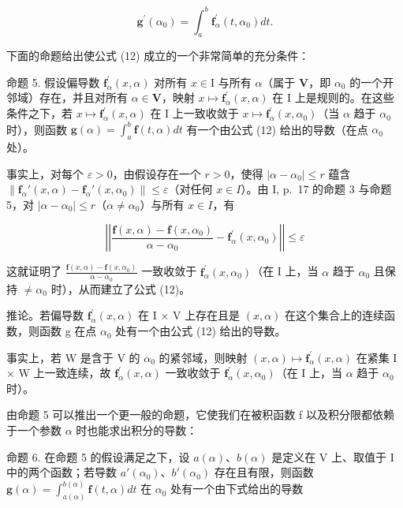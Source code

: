 \[
\mathbf {g} ^ {\prime} (\alpha_ {0}) = \int_ {a} ^ {b} \mathbf {f} _ {\alpha} ^ {\prime} (t, \alpha_ {0}) d t.\tag{12}
\]

下面的命题给出使公式 (12) 成立的一个非常简单的充分条件：

命题 5. 假设偏导数 \(\mathbf{f}_{\alpha}^{\prime}(x,\alpha)\) 对所有 \(x\in \mathrm{I}\) 与所有 \(\alpha\)（属于 \(\mathbf{V}\)，即 \(\alpha_0\) 的一个开邻域）存在，并且对所有 \(\alpha \in \mathbf{V}\)，映射 \(x\mapsto \mathbf{f}_{\alpha}^{\prime}(x,\alpha)\) 在 \(\mathrm{I}\) 上是规则的。在这些条件之下，若 \(x\mapsto \mathbf{f}_{\alpha}^{\prime}(x,\alpha)\) 在 \(\mathrm{I}\) 上一致收敛于 \(x\mapsto \mathbf{f}_{\alpha}^{\prime}(x,\alpha_0)\)（当 \(\alpha\) 趋于 \(\alpha_0\) 时），则函数 \(\mathbf{g}(\alpha) = \int_{a}^{b}\mathbf{f}(t,\alpha)dt\) 有一个由公式 (12) 给出的导数（在点 \(\alpha_0\) 处）。

事实上，对每个 \(\varepsilon > 0\)，由假设存在一个 \(r > 0\)，使得 \(|\alpha - \alpha_0| \leqslant r\) 蕴含 \(\left\| \mathbf{f}_{\alpha}'(x, \alpha) - \mathbf{f}_{\alpha}'(x, \alpha_0) \right\| \leqslant \varepsilon\)（对任何 \(x \in I\)）。由 I, p.~17 的命题 3 与命题 5，对 \(|\alpha - \alpha_0| \leqslant r\)（\(\alpha \neq \alpha_0\)）与所有 \(x \in I\)，有

\[
\left| \left| \frac {\mathbf {f} (x , \alpha) - \mathbf {f} (x , \alpha_ {0})}{\alpha - \alpha_ {0}} - \mathbf {f} _ {\alpha} ^ {\prime} (x, \alpha_ {0}) \right| \right| \leqslant \varepsilon
\]

这就证明了 \(\frac{\mathbf{f}(x,\alpha)-\mathbf{f}(x,\alpha_{0})}{\alpha-\alpha_{0}}\) 一致收敛于 \(\mathbf{f}_{\alpha}^{\prime}(x,\alpha_{0})\)（在 I 上，当 \(\alpha\) 趋于 \(\alpha_{0}\) 且保持 \(\neq\alpha_{0}\) 时），从而建立了公式 (12)。

推论。若偏导数 \(\mathbf{f}_{\alpha}^{\prime}(x,\alpha)\) 在 I × V 上存在且是 \((x,\alpha)\) 在这个集合上的连续函数，则函数 g 在点 \(\alpha_{0}\) 处有一个由公式 (12) 给出的导数。

事实上，若 W 是含于 V 的 \(\alpha_{0}\) 的紧邻域，则映射 \((x,\alpha)\mapsto\mathbf{f}_{\alpha}^{\prime}(x,\alpha)\) 在紧集 I × W 上一致连续，故 \(\mathbf{f}_{\alpha}^{\prime}(x,\alpha)\) 一致收敛于 \(\mathbf{f}_{\alpha}^{\prime}(x,\alpha_{0})\)（在 I 上，当 \(\alpha\) 趋于 \(\alpha_{0}\) 时）。

由命题 5 可以推出一个更一般的命题，它使我们在被积函数 f 以及积分限都依赖于一个参数 \(\alpha\) 时也能求出积分的导数：

命题 6. 在命题 5 的假设满足之下，设 \(a(\alpha)\)、\(b(\alpha)\) 是定义在 V 上、取值于 I 中的两个函数；若导数 \(a'(\alpha_0)\)、\(b'(\alpha_0)\) 存在且有限，则函数 \(\mathbf{g}(\alpha) = \int_{a(\alpha)}^{b(\alpha)} \mathbf{f}(t, \alpha) dt\) 在 \(\alpha_0\) 处有一个由下式给出的导数

